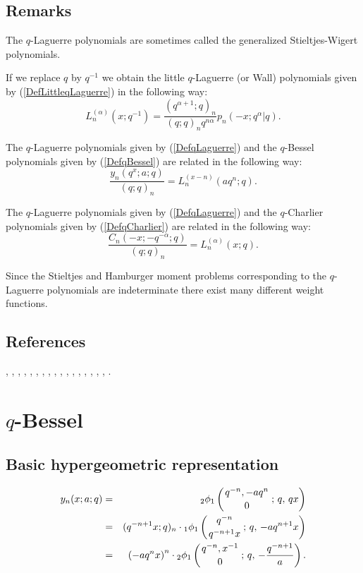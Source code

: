 \documentclass[envcountchap,graybox]{svmono}
\newcommand{\qhyp}[5]{\mbox{}_{#1}{\phi}_{#2}
\left(\genfrac{}{}{0pt}{}{#3}{#4}\,;\,q,\,#5\right)}
\begin{document}
\subsection*{Remarks} 
The $q$-Laguerre polynomials are sometimes called the
generalized Stieltjes-Wigert polynomials.

If we replace $q$ by $q^{-1}$ we obtain the little $q$-Laguerre
(or Wall) polynomials given by (\ref{DefLittleqLaguerre}) in the following
way:
$$L_n^{(\alpha)}(x;q^{-1})=\frac{(q^{\alpha+1};q)_n}{(q;q)_nq^{n\alpha}}p_n(-x;q^{\alpha}|q).$$

\noindent
The $q$-Laguerre polynomials given by (\ref{DefqLaguerre}) and the $q$-Bessel polynomials
given by (\ref{DefqBessel}) are related in the following way:
$$\frac{y_n(q^x;a;q)}{(q;q)_n}=L_n^{(x-n)}(aq^n;q).$$

\noindent
The $q$-Laguerre polynomials given by (\ref{DefqLaguerre}) and the
$q$-Charlier polynomials given by (\ref{DefqCharlier}) are related in the
following way:
$$\frac{C_n(-x;-q^{-\alpha};q)}{(q;q)_n}=L_n^{(\alpha)}(x;q).$$

\noindent
Since the Stieltjes and Hamburger moment problems corresponding to the
$q$-Laguerre polynomials are indeterminate there exist many different weight
functions.

\subsection*{References}
\cite{NAlSalam89}, \cite{AlSalam90}, \cite{Askey86}, \cite{Askey89I}, \cite{AskeyWilson85},
\cite{AtakAtakI}, \cite{ChenIsmailMuttalib}, \cite{Chihara68II}, \cite{Chihara78},
\cite{Chihara79}, \cite{Chris}, \cite{Exton77}, \cite{GasperRahman90}, \cite{GrunbaumHaine96},
\cite{Ismail2005I}, \cite{IsmailRahman98}, \cite{Jain95}, \cite{Moak}.


\section{$q$-Bessel}
\par\setcounter{equation}{0}

\subsection*{Basic hypergeometric representation}
\begin{eqnarray}
\label{DefqBessel}
y_n(x;a;q)&=&\qhyp{2}{1}{q^{-n},-aq^n}{0}{qx}\\
&=&(q^{-n+1}x;q)_n\cdot\qhyp{1}{1}{q^{-n}}{q^{-n+1}x}{-aq^{n+1}x}\nonumber\\
&=&\left(-aq^nx\right)^n\cdot\qhyp{2}{1}{q^{-n},x^{-1}}{0}{-\frac{q^{-n+1}}{a}}.\nonumber
\end{eqnarray}
\end{document}

